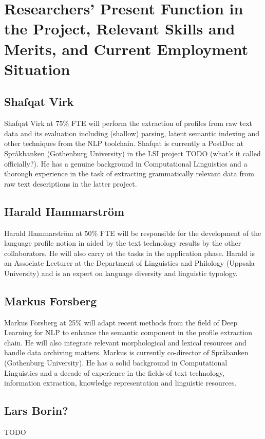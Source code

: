 ﻿\documentclass[12pt]{article}
\begin{document}
\section{Researchers' Present Function in the Project, Relevant Skills and Merits, and Current Employment Situation}

\subsection{Shafqat Virk}
Shafqat Virk at 75\% FTE will perform the extraction of profiles from
raw text data and its evaluation including (shallow) parsing, latent
semantic indexing and other techniques from the NLP toolchain. Shafqat
is currently a PostDoc at Spr\aa{}kbanken (Gothenburg University) in
the LSI project TODO (what's it called officially?). He has a genuine
background in Computational Linguistics and a thorough experience in
the task of extracting grammatically relevant data from raw text
descriptions in the latter project.

\subsection{Harald Hammarstr\"om}
Harald Hammarstr\"om at 50\% FTE will be responsible for the
development of the language profile notion in aided by the text
technology results by the other collaborators. He will also carry ot
the tasks in the application phase. Harald is an Associate Lecturer at
the Department of Linguistics and Philology (Uppsala University) and
is an expert on language diversity and linguistic typology.

\subsection{Markus Forsberg}
Markus Forsberg at 25\% will adapt recent methods from the field of
Deep Learning for NLP to enhance the semantic component in the profile
extraction chain. He will also integrate relevant morphological and
lexical resources and handle data archiving matters. Markus is
currently co-director of Spr\aa{}banken (Gothenburg University). He
has a solid background in Computational Linguistics and a decade of
experience in the fields of text technology, information extraction,
knowledge representation and linguistic resources.

\subsection{Lars Borin?}
TODO
\end{document}
